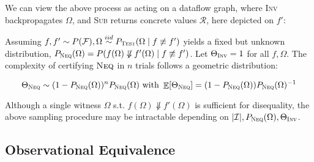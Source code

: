 \documentclass[11pt]{article}
\begin{document}
    \noindent We can view the above process as acting on a dataflow graph, where \textsc{Inv} backpropagates $\Omega$, and \textsc{Sub} returns concrete values $\mathcal{R}$, here depicted on $f'$:

    \hspace{-30pt}\hspace{-20pt}

    \noindent Assuming $f, f' \sim P(\mathcal{F}), \Omega \overset{iid}{\sim} P_\textsc{Test}(\Omega \mid f \not\equiv f')$ yields a fixed but unknown distribution, $P_\textsc{Neq}(\Omega) = P(f(\Omega)\not\Downarrow f'(\Omega) \mid f \not\equiv f')$. Let $\Theta_\textsc{Inv} = 1$ for all $f, \Omega$. The complexity of certifying $\textsc{Neq}$ in $n$ trials follows a geometric distribution:

    \vspace{-10pt}$$\Theta_\textsc{Neq} \sim (1 - P_\textsc{Neq}(\Omega))^nP_\textsc{Neq}(\Omega) \text{ with } \mathop{\mathbb{E}}[\Theta_\textsc{Neq}] = (1-P_\textsc{Neq}(\Omega))P_\textsc{Neq}(\Omega)^{-1}$$

    \noindent Although a single witness $\Omega$ s.t. $f(\Omega) \not\Downarrow f'(\Omega)$ is sufficient for disequality, the above sampling procedure may be intractable depending on $|\mathcal{I}|, P_\textsc{Neq}(\Omega), \Theta_{\textsc{Inv}}$.





    \pagebreak\subsection{Observational Equivalence}
\end{document}
